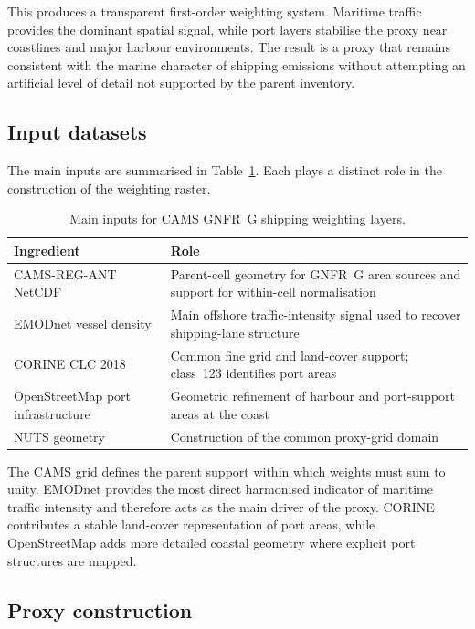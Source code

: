 This produces a transparent first-order weighting system. Maritime
traffic provides the dominant spatial signal, while port layers stabilise
the proxy near coastlines and major harbour environments. The result is a
proxy that remains consistent with the marine character of shipping
emissions without attempting an artificial level of detail not supported
by the parent inventory.

\subsection{Input datasets}

The main inputs are summarised in
Table~\ref{tab:shipping_inputs}. Each plays a distinct role in the
construction of the weighting raster.

\begin{table}[htbp]
  \centering
  \caption{Main inputs for CAMS GNFR~G shipping weighting layers.}
  \label{tab:shipping_inputs}
  \begin{tabular}{p{3.6cm}p{9.1cm}}
    \hline
    Ingredient & Role \\
    \hline
    CAMS-REG-ANT NetCDF & Parent-cell geometry for GNFR~G area sources and support for within-cell normalisation \\
    EMODnet vessel density & Main offshore traffic-intensity signal used to recover shipping-lane structure \\
    CORINE CLC 2018 & Common fine grid and land-cover support; class~123 identifies port areas \\
    OpenStreetMap port infrastructure & Geometric refinement of harbour and port-support areas at the coast \\
    NUTS geometry & Construction of the common proxy-grid domain \\
    \hline
  \end{tabular}
\end{table}

The CAMS grid defines the parent support within which weights must sum to
unity. EMODnet provides the most direct harmonised indicator of maritime
traffic intensity and therefore acts as the main driver of the proxy.
CORINE contributes a stable land-cover representation of port areas,
while OpenStreetMap adds more detailed coastal geometry where explicit
port structures are mapped.

\subsection{Proxy construction}


